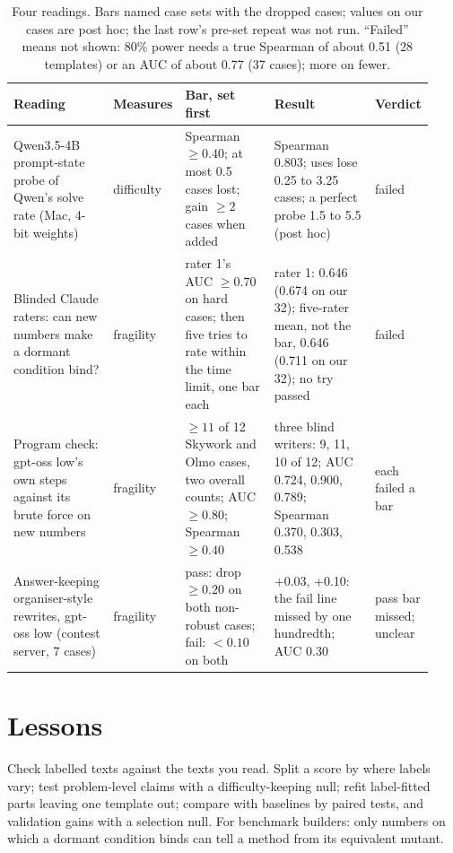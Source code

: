 \documentclass{article}
\begin{document}
\begin{table}[t]
\caption{Four readings. Bars named case sets with the dropped cases; values on our cases are post hoc; the last row's
pre-set repeat was not run. ``Failed'' means not shown: 80\% power needs a true Spearman of about 0.51 (28 templates)
or an AUC of about 0.77 (37 cases); more on fewer.}
\label{tab:neg}
\centering
\footnotesize
\setlength{\tabcolsep}{3pt}
\begin{tabular}{@{}p{0.25\linewidth}p{0.09\linewidth}p{0.22\linewidth}p{0.25\linewidth}p{0.12\linewidth}@{}}
\toprule
Reading & Measures & Bar, set first & Result & Verdict \\
\midrule
Qwen3.5-4B prompt-state probe of Qwen's solve rate (Mac, 4-bit weights) & difficulty & Spearman $\geq 0.40$; at
most 0.5 cases lost; gain $\geq 2$ cases when added & Spearman 0.803; uses lose 0.25 to 3.25 cases; a perfect
probe 1.5 to 5.5 (post hoc) & failed \\
Blinded Claude raters: can new numbers make a dormant condition bind? & fragility & rater 1's AUC $\geq 0.70$ on hard
cases; then five tries to rate within the time limit, one bar each & rater 1: 0.646 (0.674 on our 32);
five-rater mean, not the bar, 0.646 (0.711 on our 32); no try passed & failed \\
Program check: gpt-oss low's own steps against its brute force on new numbers & fragility & $\geq 11$ of 12 Skywork and
Olmo cases, two overall counts; AUC $\geq 0.80$; Spearman $\geq 0.40$ & three blind writers: 9, 11, 10 of 12; AUC 0.724, 0.900,
0.789; Spearman 0.370, 0.303, 0.538 & each failed a bar \\
Answer-keeping organiser-style rewrites, gpt-oss low (contest server, 7 cases) & fragility & pass: drop $\geq 0.20$ on both
non-robust cases; fail: $< 0.10$ on both & +0.03, +0.10: the fail line missed by one hundredth; AUC 0.30 & pass bar missed; unclear \\
\bottomrule
\end{tabular}
\end{table}

\section{Lessons}
\label{sec:lessons}

Check labelled texts against the texts you read. Split a score by where labels vary; test problem-level claims with a
difficulty-keeping null; refit label-fitted parts leaving one template out; compare with baselines by paired tests, and
validation gains with a selection null. For benchmark builders: only numbers on which a dormant condition binds can tell
a method from its equivalent mutant.
\end{document}
